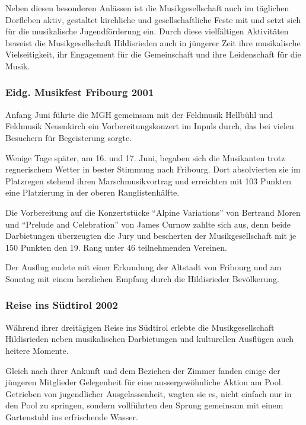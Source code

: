 \begin{history}
    Neben diesen besonderen Anlässen ist die Musikgesellschaft auch im täglichen
    Dorfleben aktiv, gestaltet kirchliche und gesellschaftliche Feste mit und
    setzt sich für die musikalische Jugendförderung ein. Durch diese
    vielfältigen Aktivitäten beweist die Musikgesellschaft Hildisrieden auch in
    jüngerer Zeit ihre musikalische Vielseitigkeit, ihr Engagement für die
    Gemeinschaft und ihre Leidenschaft für die Musik.

    \subsubsection*{Eidg. Musikfest Fribourg 2001}

    Anfang Juni führte die MGH gemeinsam mit der Feldmusik Hellbühl und
    Feldmusik Neuenkirch ein Vorbereitungskonzert im Inpuls durch, das bei
    vielen Besuchern für Begeisterung sorgte.

    Wenige Tage später, am 16. und 17. Juni, begaben sich die Musikanten trotz
    regnerischem Wetter in bester Stimmung nach Fribourg. Dort absolvierten sie
    im Platzregen stehend ihren Marschmusikvortrag und erreichten mit 103
    Punkten eine Platzierung in der oberen Ranglistenhälfte.

    Die Vorbereitung auf die Konzertstücke \enquote{Alpine Variations} von
    Bertrand Moren und \enquote{Prelude and Celebration} von James Curnow zahlte
    sich aus, denn beide Darbietungen überzeugten die Jury und bescherten der
    Musikgesellschaft mit je 150 Punkten den 19. Rang unter 46 teilnehmenden
    Vereinen.

    Der Ausflug endete mit einer Erkundung der Altstadt von Fribourg und am
    Sonntag mit einem herzlichen Empfang durch die Hildisrieder Bevölkerung.

    \subsubsection*{Reise ins Südtirol 2002}
    Während ihrer dreitägigen Reise ins Südtirol erlebte die Musikgesellschaft
    Hildisrieden neben musikalischen Darbietungen und kulturellen Ausflügen auch
    heitere Momente.

    Gleich nach ihrer Ankunft und dem Beziehen der Zimmer fanden einige der
    jüngeren Mitglieder Gelegenheit für eine aussergewöhnliche Aktion am Pool.
    Getrieben von jugendlicher Ausgelassenheit, wagten sie es, nicht einfach nur
    in den Pool zu springen, sondern vollführten den Sprung gemeinsam mit einem
    Gartenstuhl ins erfrischende Wasser.


\end{history}
